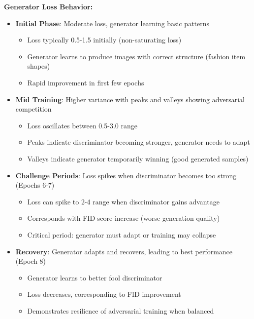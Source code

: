 \documentclass[conference,12pt]{IEEEtran}
\begin{document}
\textbf{Generator Loss Behavior:}
\begin{itemize}
    \item \textbf{Initial Phase}: Moderate loss, generator learning basic patterns
    \begin{itemize}
        \item Loss typically 0.5-1.5 initially (non-saturating loss)
        \item Generator learns to produce images with correct structure (fashion item shapes)
        \item Rapid improvement in first few epochs
    \end{itemize}
    \item \textbf{Mid Training}: Higher variance with peaks and valleys showing adversarial competition
    \begin{itemize}
        \item Loss oscillates between 0.5-3.0 range
        \item Peaks indicate discriminator becoming stronger, generator needs to adapt
        \item Valleys indicate generator temporarily winning (good generated samples)
    \end{itemize}
    \item \textbf{Challenge Periods}: Loss spikes when discriminator becomes too strong (Epochs 6-7)
    \begin{itemize}
        \item Loss can spike to 2-4 range when discriminator gains advantage
        \item Corresponds with FID score increase (worse generation quality)
        \item Critical period: generator must adapt or training may collapse
    \end{itemize}
    \item \textbf{Recovery}: Generator adapts and recovers, leading to best performance (Epoch 8)
    \begin{itemize}
        \item Generator learns to better fool discriminator
        \item Loss decreases, corresponding to FID improvement
        \item Demonstrates resilience of adversarial training when balanced
    \end{itemize}
\end{itemize}
\end{document}
